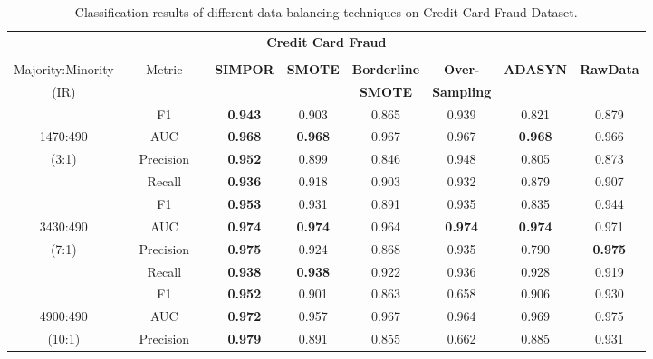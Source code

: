 \begin{table}[ht]
	\centering
	\caption{Classification results of different data balancing techniques on Credit Card Fraud Dataset.}
	\label{tab:creditCardResult}%

		\begin{tabular}{rrcrcccccc}
			\toprule
			\multicolumn{10}{c}{\textbf{Credit Card Fraud}} \\
			&       &       &       &       &       &       &       &       &  \\
			\multicolumn{1}{c}{Majority:Minority} &       & Metric &       & \textbf{SIMPOR} & \textbf{SMOTE} & \textbf{Borderline} & \textbf{Over-} & \textbf{ADASYN} & \textbf{RawData} \\
			\multicolumn{1}{c}{(IR)} &       &       &       &       &       & \textbf{SMOTE} & \textbf{Sampling} &       &  \\
			\cmidrule{1-1}\cmidrule{3-3}\cmidrule{5-10}          &       & F1    &       & \textbf{0.943} & 0.903 & 0.865 & 0.939 & 0.821 & 0.879 \\
			\multicolumn{1}{c}{1470:490 } &       & AUC   &       & \textbf{0.968} & \textbf{0.968} & 0.967 & 0.967 & \textbf{0.968} & 0.966 \\
			\multicolumn{1}{c}{(3:1)} &       & Precision &       & \textbf{0.952} & 0.899 & 0.846 & 0.948 & 0.805 & 0.873 \\
			&       & Recall &       & \textbf{0.936} & 0.918 & 0.903 & 0.932 & 0.879 & 0.907 \\
			\cmidrule{1-1}\cmidrule{3-3}\cmidrule{5-10}          &       & F1    &       & \textbf{0.953} & 0.931 & 0.891 & 0.935 & 0.835 & 0.944 \\
			\multicolumn{1}{c}{3430:490 } &       & AUC   &       & \textbf{0.974} & \textbf{0.974} & 0.964 & \textbf{0.974} & \textbf{0.974} & 0.971 \\
			\multicolumn{1}{c}{(7:1)} &       & Precision &       & \textbf{0.975}  & 0.924 & 0.868 & 0.935 & 0.790  & \textbf{0.975} \\
			&       & Recall &       & \textbf{0.938} & \textbf{0.938} & 0.922 & 0.936 & 0.928 & 0.919 \\
			\cmidrule{1-1}\cmidrule{3-3}\cmidrule{5-10}          &       & F1    &       & \textbf{0.952} & 0.901 & 0.863 & 0.658 & 0.906 & 0.930 \\
			\multicolumn{1}{c}{4900:490 } &       & AUC   &       & \textbf{0.972} & 0.957 & 0.967 & 0.964 & 0.969 & 0.975 \\
			\multicolumn{1}{c}{(10:1)} &       & Precision &       & \textbf{0.979} & 0.891 & 0.855 & 0.662 & 0.885 & 0.931 \\

\end{tabular}
\end{table}

